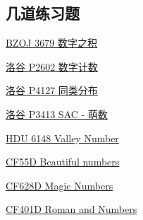 \subsection{几道练习题}

\href{https://www.lydsy.com/JudgeOnline/problem.php?id=3679}{BZOJ 3679 数字之积 }

\href{https://www.luogu.org/problemnew/show/P2602}{洛谷 P2602 数字计数 }

\href{https://www.luogu.org/problemnew/show/P4127}{洛谷 P4127 同类分布 }

\href{https://www.luogu.org/problemnew/show/P3413}{洛谷  P3413 SAC - 萌数}

\href{http://acm.hdu.edu.cn/showproblem.php?pid=6148}{HDU 6148 Valley Number }

\href{http://codeforces.com/problemset/problem/55/D}{CF55D Beautiful numbers}

\href{http://codeforces.com/problemset/problem/628/D}{CF628D Magic Numbers}

\href{http://codeforces.com/problemset/problem/401/D}{CF401D Roman and Numbers}
